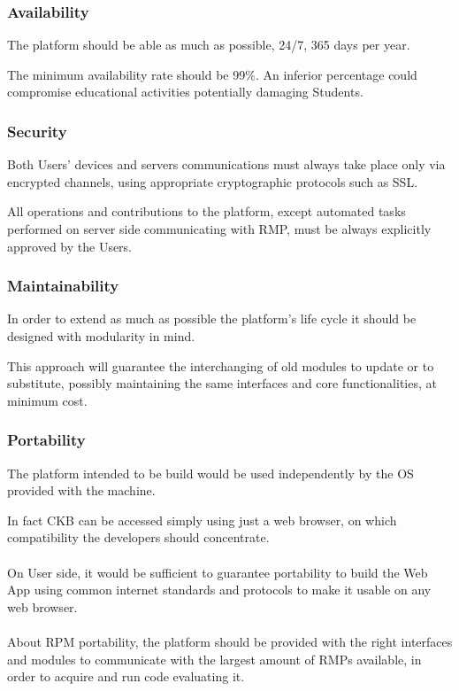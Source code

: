 \subsubsection{Availability}
The platform should be able as much as possible, 24/7, 365 days per year. 

The minimum availability rate should be 99\%. An inferior percentage could compromise educational activities potentially damaging Students.

\subsubsection{Security}
Both Users' devices and servers communications must always take place only via encrypted channels, using appropriate cryptographic protocols such as SSL. 

All operations and contributions to the platform, except automated tasks performed on server side communicating with RMP, must be always explicitly approved by the Users.

\subsubsection{Maintainability}
In order to extend as much as possible the platform's life cycle it should be designed with modularity in mind. 

This approach will guarantee the interchanging of old modules to update or to substitute, possibly maintaining the same interfaces and core functionalities, at minimum cost.

\subsubsection{Portability}
The platform intended to be build would be used independently by the OS provided with the machine. 

In fact CKB can be accessed simply using just a web browser, on which compatibility the developers should concentrate.\\ 
\\
On User side, it would be sufficient to guarantee portability to build the Web App using common internet standards and protocols to make it usable on any web browser.\\
\\
About RPM portability, the platform should be provided with the right interfaces and modules to communicate with the largest amount of RMPs available, in order to acquire and run code evaluating it.